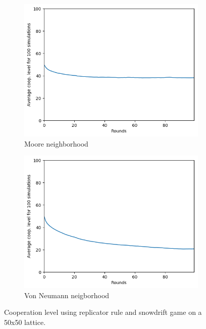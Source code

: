 \documentclass[letterpaper]{article}
\begin{document}
\begin{figure}[H]
    \begin{subfigure}{.5\textwidth}
        \centering
        \includegraphics[width=1\linewidth]{images/assign2/50-part2}
        \caption{Moore neighborhood}
        \label{fig:50moorepart2}
    \end{subfigure}
    \begin{subfigure}{.5\textwidth}
        \centering
        \includegraphics[width=1\linewidth]{images/assign2/50_vonneumann-part2}
        \caption{Von Neumann neigborhood}
        \label{fig:50vonpart2}
    \end{subfigure}
    \caption{Cooperation level using replicator rule and
    snowdrift game on a 50x50 lattice.}
    \label{fig:50part2}
\end{figure}
\end{document}
